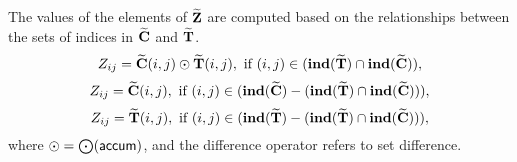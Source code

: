 \begin{itemize}
    The values of the elements of ${\bf \widetilde{Z}}$ are computed based on the
    relationships between the sets of indices in ${\bf \widetilde{C}}$ and 
    ${\bf \widetilde{T}}$.
\[
    Z_{ij} = {\bf \widetilde{C}}(i,j) \odot {\bf \widetilde{T}}(i,j), \ \mbox{if}\  
    (i,j) \in  (\bold{ind}({\bf \widetilde{T}}) \cap \bold{ind}({\bf \widetilde{C}})),
\]
\[
    Z_{ij} = \matrix{\widetilde{C}}(i,j), \ \mbox{if}\  
    (i,j) \in (\bold{ind}(\matrix{\widetilde{C}}) - (\bold{ind}(\matrix{\widetilde{T}})
    \cap \bold{ind}(\matrix{\widetilde{C}}))),
\]
\[
    Z_{ij} = \matrix{\widetilde{T}}(i,j), \ \mbox{if}\  (i,j) \in  
    (\bold{ind}(\matrix{\widetilde{T}}) - (\bold{ind}(\matrix{\widetilde{T}})
    \cap \bold{ind}(\matrix{\widetilde{C}}))),
\]
where $\odot  = \bigodot({\sf accum})$, and the difference operator refers to set difference.
\end{itemize}



